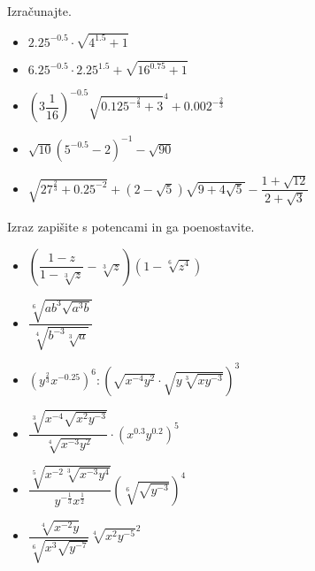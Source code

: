         
            \begin{naloga}
                Izračunajte.
                \begin{multicols}{2}
                    \begin{itemize}
                        \item $\displaystyle 2.25^{-0.5}\cdot\sqrt{4^{1.5}+1} $ 
                        \item $\displaystyle 6.25^{-0.5}\cdot 2.25^{1.5}+\sqrt{16^{0.75}+1} $ 
                        \item $\displaystyle \left(3\dfrac{1}{16}\right)^{-0.5}\sqrt{0.125^{-\frac{2}{3}}+3}^4+0.002^{-\frac{2}{3}} $ 
                        \item $\displaystyle \sqrt{10}\left(5^{-0.5}-2\right)^{-1}-\sqrt{90} $ 
                   \end{itemize}
                \end{multicols}
                    \begin{itemize}
                        \item $\displaystyle \sqrt{27^\frac{2}{3}+0.25^{-2}}+\left(2-\sqrt{5}\right)\sqrt{9+4\sqrt{5}}-\dfrac{1+\sqrt{12}}{2+\sqrt{3}} $ 
                    \end{itemize}

            \end{naloga}

        
            \begin{naloga}
                Izraz zapišite s potencami in ga poenostavite.
                \begin{multicols}{2}
                    \begin{itemize}
                        \item $\displaystyle \left(\dfrac{1-z}{1-\sqrt[3]{z}}-\sqrt[3]{z}\right)\left(1-\sqrt[6]{z^4}\right)$ 
                        \item $\displaystyle \dfrac{\sqrt[6]{ab^3\sqrt{a^3b}}}{\sqrt[4]{b^{-3}\sqrt[3]{a}}}$ 
                        \item $\displaystyle \left(y^\frac{2}{3}x^{-0.25}\right)^6 :\left(\sqrt{x^{-4}y^2}\cdot\sqrt{y\sqrt[3]{xy^{-3}}}\right)^3 $ 
                        \item $\displaystyle \dfrac{\sqrt[3]{x^{-4}\sqrt{x^2y^{-3}}}}{\sqrt[4]{x^{-3}y^2}}\cdot\left(x^{0.3}y^{0.2}\right)^5 $ 
                        \item $\displaystyle \dfrac{\sqrt[5]{x^{-2}\sqrt[3]{x^{-3}y^4}}}{y^{-\frac{1}{3}}x^\frac{1}{2}}\left(\sqrt[6]{\sqrt{y^{-3}}}\right)^4 $ 
                        \item $\displaystyle \dfrac{\sqrt[4]{x^{-2}y}}{\sqrt[6]{x^3\sqrt{y^{-7}}}}\sqrt[4]{x^2y^{-5}}^2 $ 
                    \end{itemize}
                \end{multicols}
            \end{naloga}
        





